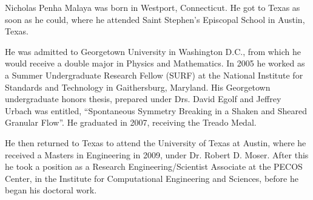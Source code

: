 
Nicholas Penha Malaya was born in Westport, Connecticut. He got to Texas
as soon as he could, where he attended Saint Stephen's Episcopal School in
Austin, Texas. 

He was admitted to Georgetown University in Washington D.C., from
which he would receive a double major in Physics and Mathematics. In
2005 he worked as a Summer Undergraduate Research Fellow (SURF) at the
National Institute for Standards and Technology in Gaithersburg,
Maryland. His Georgetown undergraduate honors thesis, prepared under
Drs\@. David Egolf and Jeffrey Urbach was entitled, ``Spontaneous
Symmetry Breaking in a Shaken and Sheared Granular Flow''. He graduated
in 2007, receiving the Treado Medal.   

He then returned to Texas to attend the University of Texas at
Austin, where he received a Masters in Engineering in 2009, under
Dr\@. Robert D. Moser. After this he took a position as a Research
Engineering/Scientist Associate at the PECOS Center, in the Institute
for Computational Engineering and Sciences, before he began his
doctoral work. 


